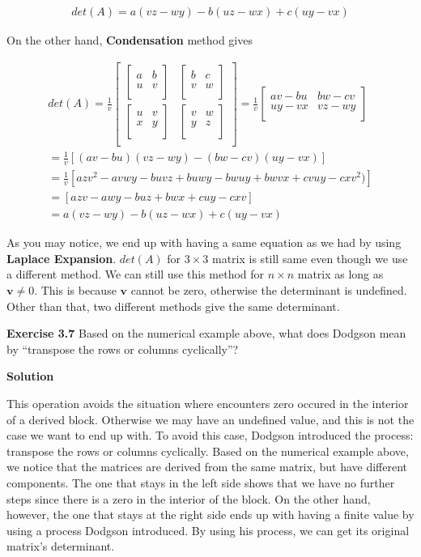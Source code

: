 \documentclass[12pt]{article}
\newcommand{\matxx}[2] {
\begin{bmatrix}
  #1 \\
  #2 \\
\end{bmatrix}
}
\begin{document}
\[
\begin{split}
  det(A)
  = a(vz-wy) - b(uz-wx) + c(uy-vx)
\end{split}
\]

On the other hand, \textbf{Condensation} method gives

\[
  \begin{split}
    det(A) =
    \frac{1}{v}
    \matxx
    {
      \matxx{a & b}{u & v} &
      \matxx{b & c}{v & w}
    }
    {
      \matxx{u & v}{x & y} &
      \matxx{v & w}{y & z}
    }
    =
    \frac{1}{v}
    \matxx
    {
      av - bu &
      bw - cv
    }
    {
      uy-vx &
      vz - wy
    } \\
    = \frac{1}{v}\left[(av-bu)(vz-wy) - (bw-cv)(uy-vx)\right] \\
    = \frac{1}{v}\left[azv^2 - avwy - buvz + buwy - bwuy + bwvx + cvuy - cxv^2)\right] \\
    = \left[azv - awy - buz + bwx + cuy - cxv \right] \\
    = a(vz-wy) - b(uz-wx) + c(uy-vx)
  \end{split}
\]

As you may notice, we end up with having a same equation as we had by using \textbf{Laplace Expansion}. \(det(A)\) for \(3 \times 3\) matrix is still same even though we use a different method.
We can still use this method for \(n \times n\) matrix as long as \(\mathbf{v} \neq 0\).
This is because \(\mathbf{v}\) cannot be zero, otherwise the determinant is undefined.
Other than that, two different methods give the same determinant.

\bigskip

\textbf{Exercise 3.7} Based on the numerical example above, what does Dodgson mean by “transpose the rows or columns cyclically”?

\bigskip

\textbf{Solution}

This operation avoids the situation where encounters zero occured in the interior of a derived block. Otherwise we may have an undefined value, and this is not the case we want to end up with.
To avoid this case, Dodgson introduced the process: transpose the rows or columns cyclically.
Based on the numerical example above, we notice that the matrices are derived from the same matrix, but have different components. The one that stays in the left side shows that we have no further steps since there is a zero in the interior of the block.
On the other hand, however, the one that stays at the right side ends up with having a finite value by using a process Dodgson introduced.
By using his process, we can get its original matrix's determinant.
\end{document}
